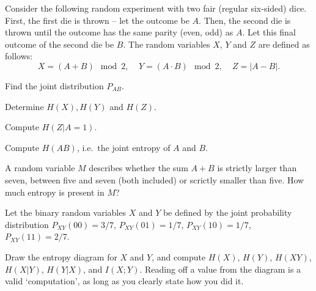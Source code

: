 \documentclass[a4paper,10pt,landscape,twocolumn]{scrartcl}
\begin{document}
\homeworkproblems

\begin{exercise}
Consider the following random experiment with two fair (regular six-sided) dice. First, the first die is thrown -- let the outcome be $A$. Then, the second die is thrown until the outcome has the same parity (even, odd) as $A$. Let this final outcome of the second die be $B$. The random variables $X$, $Y$ and $Z$ are defined as follows:
\[
X = (A + B) \mod 2, \ \ \ \ \ Y = (A \cdot B) \mod 2, \ \ \ \ \ Z = |A - B|.
\]
	\begin{subex}[(1pt)]
	Find the joint distribution $P_{AB}$.
	\end{subex}
	\begin{subex}[(1pt)]
	Determine $H(X), H(Y)$ and $H(Z)$.
	\end{subex}
	\begin{subex}[(1pt)]
	Compute $H(Z|A=1)$.
	\end{subex}
	\begin{subex}[(1pt)]
	Compute $H(AB)$, i.e.\ the joint entropy of $A$ and $B$.
	\end{subex}
	\begin{subex}[(2pt)]
	A random variable $M$ describes whether the sum $A + B$ is strictly larger than seven, between five and seven (both included) or scrictly smaller than five. How much entropy is present in $M$?
	\end{subex}
\end{exercise}

\begin{exercise}
Let the binary random variables $X$ and $Y$ be defined by the joint probability distribution $P_{XY}(00) = 3/7$, $P_{XY}(01) = 1/7$, $P_{XY}(10) = 1/7$, $P_{XY}(11) = 2/7$.

Draw the entropy diagram for $X$ and $Y$, and compute $H(X)$, $H(Y)$, $H(XY)$, $H(X|Y)$, $H(Y|X)$, and $I(X;Y)$. Reading off a value from the diagram is a valid `computation', as long as you clearly state how you did it.
\begin{center}
\end{center}
\end{exercise}
\end{document}
